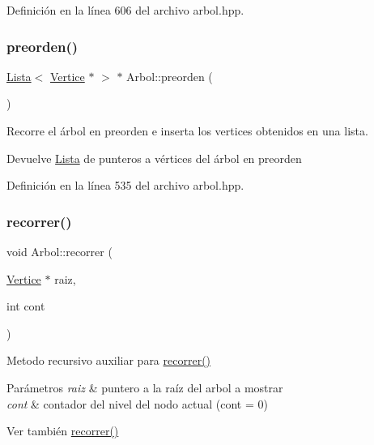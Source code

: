 Definición en la línea 606 del archivo arbol.\+hpp.

\mbox{\label{classArbol_a0ffdc60ce8f2267366681cc94cf6beea}} 
\subsubsection{\texorpdfstring{preorden()}{preorden()}}
{\footnotesize\ttfamily \hyperlink{classLista}{Lista}$<$ \hyperlink{classVertice}{Vertice} $\ast$ $>$ $\ast$ Arbol\+::preorden (\begin{DoxyParamCaption}{ }\end{DoxyParamCaption})}



Recorre el árbol en preorden e inserta los vertices obtenidos en una lista. 

\begin{DoxyReturn}{Devuelve}
\hyperlink{classLista}{Lista} de punteros a vértices del árbol en preorden 
\end{DoxyReturn}


Definición en la línea 535 del archivo arbol.\+hpp.

\mbox{\label{classArbol_a0ae46c572d300cd4a5f27b7d00a1a14e}} 
\subsubsection{\texorpdfstring{recorrer()}{recorrer()}}
{\footnotesize\ttfamily void Arbol\+::recorrer (\begin{DoxyParamCaption}\item[{\hyperlink{classVertice}{Vertice} $\ast$}]{raiz,  }\item[{int}]{cont }\end{DoxyParamCaption})}



Metodo recursivo auxiliar para \hyperlink{classArbol_a5bd356760f63521e8578a83613aa4792}{recorrer()} 


\begin{DoxyParams}{Parámetros}
{\em raiz} & puntero a la raíz del arbol a mostrar \\
\hline
{\em cont} & contador del nivel del nodo actual (cont = 0) \\
\hline
\end{DoxyParams}
\begin{DoxySeeAlso}{Ver también}
\hyperlink{classArbol_a5bd356760f63521e8578a83613aa4792}{recorrer()} 
\end{DoxySeeAlso}



